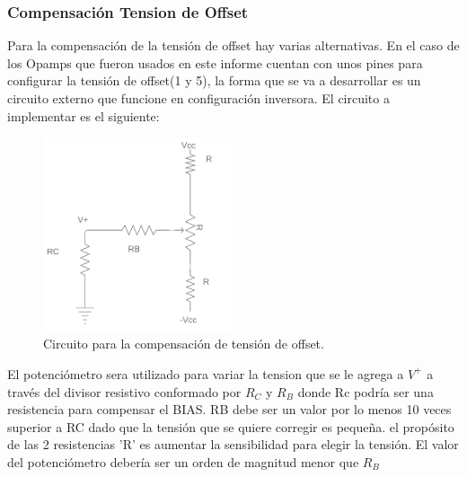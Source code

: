 \subsubsection{Compensación Tension de Offset}
Para la compensación de la tensión de offset hay varias alternativas. En el caso de los Opamps que fueron usados en este informe cuentan con unos pines para configurar la tensión de offset(1 y 5), la forma que se va a desarrollar es un circuito externo que funcione en configuración inversora.
El circuito a implementar es el siguiente:
\begin{figure}[H]	
	\centering
	\includegraphics[width=0.5\textwidth]{Ej3/imagenes/CompensacionOff.PNG}
	\caption{Circuito para la compensación de tensión de offset.}
	\label{fig:CompensacionOff}
\end{figure}
El potenciómetro sera utilizado para variar la tension que se le agrega a $V^+$ a través del divisor resistivo conformado por $R_C$ y $R_B$ donde Rc podría ser una resistencia para compensar el BIAS. RB debe ser un valor por lo menos 10 veces superior a RC dado que la tensión que se quiere corregir es pequeña. el propósito de las 2 resistencias 'R' es aumentar la sensibilidad para elegir la tensión. El valor del potenciómetro debería ser un orden de magnitud menor que $R_B $

